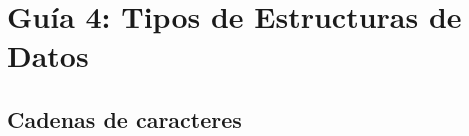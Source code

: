 \documentclass[
  letterpaper,
  DIV=11,
  numbers=noendperiod]{scrreprt}
\begin{document}
\hypertarget{guuxeda-4-tipos-de-estructuras-de-datos}{%
\section*{Guía 4: Tipos de Estructuras de
Datos}\label{guuxeda-4-tipos-de-estructuras-de-datos}}


\hypertarget{cadenas-de-caracteres-1}{%
\subsection*{Cadenas de caracteres}\label{cadenas-de-caracteres-1}}
\end{document}
